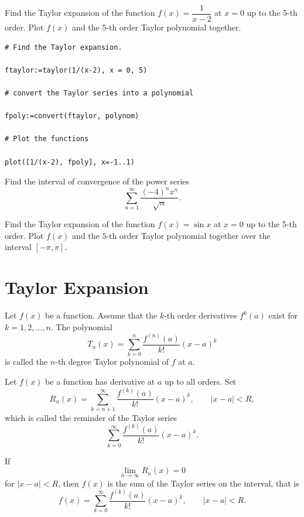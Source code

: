 \documentclass[]{book}
\theoremstyle{definition}
\theoremstyle{definition}
\theoremstyle{definition}
\theoremstyle{remark}
\let\BeginKnitrBlock\begin \let\EndKnitrBlock\end
\begin{document}
\BeginKnitrBlock{example}
\protect\hypertarget{exm:unnamed-chunk-3}{}{\label{exm:unnamed-chunk-3} }
Find the Taylor expansion of the function \(f(x)=\dfrac{1}{x-2}\) at \(x=0\) up to the 5-th order. Plot \(f(x)\) and the \(5\)-th order Taylor polynomial together.
\EndKnitrBlock{example}

\BeginKnitrBlock{solution}
{}

\begin{verbatim}
# Find the Taylor expansion.

ftaylor:=taylor(1/(x-2), x = 0, 5)

# convert the Taylor series into a polynomial

fpoly:=convert(ftaylor, polynom)

# Plot the functions

plot([1/(x-2), fpoly], x=-1..1)
\end{verbatim}
\EndKnitrBlock{solution}

\BeginKnitrBlock{exercise}
\protect\hypertarget{exr:unnamed-chunk-5}{}{\label{exr:unnamed-chunk-5} }
Find the interval of convergence of the power series
\[
\sum\limits_{n=1}^{\infty}\dfrac{(-4)^nx^n}{\sqrt{n}}.
\]
\EndKnitrBlock{exercise}

\BeginKnitrBlock{exercise}
\protect\hypertarget{exr:unnamed-chunk-6}{}{\label{exr:unnamed-chunk-6} }
Find the Taylor expansion of the function \(f(x)=\sin x\) at \(x=0\) up to the 5-th order. Plot \(f(x)\) and the \(5\)-th order Taylor polynomial together over the interval \([-\pi,\pi]\).
\EndKnitrBlock{exercise}

\hypertarget{taylor-expansion}{%
\chapter{Taylor Expansion}\label{taylor-expansion}}

Let \(f(x)\) be a function. Assume that the \(k\)-th order derivatives \(f^k(a)\) exist for \(k=1, 2, \dots, n\). The polynomial
\[
T_n(x)=\sum_{k=0}^n\dfrac{f^{(n)}(a)}{k!}(x-a)^k
\]
is called the \(n\)-th degree Taylor polynomial of \(f\) at \(a\).

Let \(f(x)\) be a function has derivative at \(a\) up to all orders. Set
\[
R_n(x)=\sum_{k=n+1}^\infty \dfrac{f^{(k)}(a)}{k!}(x-a)^k,\quad\quad \left|x-a\right|<R,
\]
which is called the reminder of the Taylor series
\[
\sum\limits_{k=0}^\infty \dfrac{f^{(k)}(a)}{k!}(x-a)^k.
\]

If
\[
\lim\limits_{n\to\infty} R_n(x)=0
\]
for \(\left|x-a\right|<R\), then \(f(x)\) is the sum of the Taylor series on the interval, that is
\[
f(x)=\sum\limits_{k=0}^\infty \dfrac{f^{(k)}(a)}{k!}(x-a)^k,\quad\quad \left|x-a\right|<R.
\]
\end{document}
